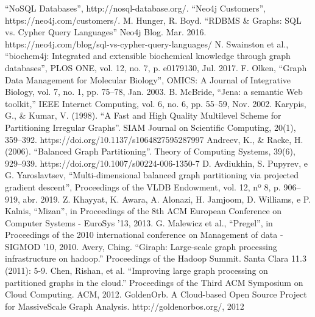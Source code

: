 \documentclass[conference]{IEEEtran}
\begin{document}
\begin{thebibliography}{00}
 ``NoSQL Databases'', http://nosql-database.org/.
 ``Neo4j Customers'', https://neo4j.com/customers/.
 M. Hunger, R. Boyd. ``RDBMS \& Graphs: SQL vs. Cypher Query Languages'' Neo4j Blog. Mar. 2016. https://neo4j.com/blog/sql-vs-cypher-query-languages/
 N. Swainston et al., ``biochem4j: Integrated and extensible biochemical knowledge through graph databases'', PLOS ONE, vol. 12, no. 7, p. e0179130, Jul. 2017. 
 F. Olken, ``Graph Data Management for Molecular Biology'', OMICS: A Journal of Integrative Biology, vol. 7, no. 1, pp. 75–78, Jan. 2003.
 B. McBride, ``Jena: a semantic Web toolkit,” IEEE Internet Computing, vol. 6, no. 6, pp. 55–59, Nov. 2002.
 Karypis, G., \& Kumar, V. (1998). ``A Fast and High Quality Multilevel Scheme for Partitioning Irregular Graphs''. SIAM Journal on Scientific Computing, 20(1), 359–392. https://doi.org/10.1137/s1064827595287997
 Andreev, K., \& Racke, H. (2006). ``Balanced Graph Partitioning''. Theory of Computing Systems, 39(6), 929–939. https://doi.org/10.1007/s00224-006-1350-7
 D. Avdiukhin, S. Pupyrev, e G. Yaroslavtsev, ``Multi-dimensional balanced graph partitioning via projected gradient descent'', Proceedings of the VLDB Endowment, vol. 12, nº 8, p. 906–919, abr. 2019.
 Z. Khayyat, K. Awara, A. Alonazi, H. Jamjoom, D. Williams, e P. Kalnis, ``Mizan'', in Proceedings of the 8th ACM European Conference on Computer Systems - EuroSys ’13, 2013.
 G. Malewicz et al., ``Pregel'', in Proceedings of the 2010 international conference on Management of data - SIGMOD ’10, 2010.
 Avery, Ching. ``Giraph: Large-scale graph processing infrastructure on hadoop.'' Proceedings of the Hadoop Summit. Santa Clara 11.3 (2011): 5-9.
 Chen, Rishan, et al. ``Improving large graph processing on partitioned graphs in the cloud.'' Proceedings of the Third ACM Symposium on Cloud Computing. ACM, 2012.
 GoldenOrb. A Cloud-based Open Source Project for MassiveScale Graph Analysis. http://goldenorbos.org/, 2012

\end{thebibliography}
\end{document}
